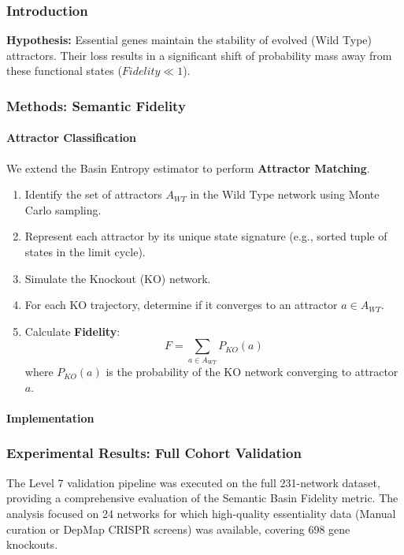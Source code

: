 





\subsubsection{Introduction}

\textbf{Hypothesis:} Essential genes maintain the stability of evolved (Wild Type) attractors. Their loss results in a significant shift of probability mass away from these functional states ($Fidelity \ll 1$).

\subsubsection{Methods: Semantic Fidelity}

\paragraph{Attractor Classification}
We extend the Basin Entropy estimator to perform \textbf{Attractor Matching}.
\begin{enumerate}
    \item Identify the set of attractors $A_{WT}$ in the Wild Type network using Monte Carlo sampling.
    \item Represent each attractor by its unique state signature (e.g., sorted tuple of states in the limit cycle).
    \item Simulate the Knockout (KO) network.
    \item For each KO trajectory, determine if it converges to an attractor $a \in A_{WT}$.
    \item Calculate \textbf{Fidelity}:
    \[ F = \sum_{a \in A_{WT}} P_{KO}(a) \]
    where $P_{KO}(a)$ is the probability of the KO network converging to attractor $a$.
\end{enumerate}

\paragraph{Implementation}

\subsubsection{Experimental Results: Full Cohort Validation}
The Level 7 validation pipeline was executed on the full 231-network dataset, providing a comprehensive evaluation of the Semantic Basin Fidelity metric. The analysis focused on 24 networks for which high-quality essentiality data (Manual curation or DepMap CRISPR screens) was available, covering 698 gene knockouts.

